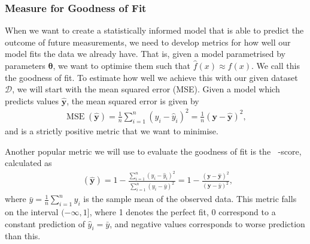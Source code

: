 \documentclass[twocolumn,english,notitlepage]{article}
\renewcommand{\vec}[1]{\boldsymbol{#1}}
\DeclareMathOperator{\mse}{MSE}
\DeclareMathOperator{\Rsquared}{R^2}
\begin{document}
    \subsubsection{Measure for Goodness of Fit}
        When we want to create a statistically informed model that is able to predict the outcome of future measurements, we need to develop metrics for how well our model fits the data we already have. That is, given a model parametrised by parameters $\vec{\theta}$, we want to optimise them such that $\hat{f}(x) \approx f(x)$. We call this the goodness of fit. To estimate how well we achieve this with our given dataset $\mathcal{D}$, we will start with the mean squared error (MSE). Given a model which predicts values $\vec{\hat{y}}$, the mean squared error is given by
        \begin{align}
            \mse(\vec{\hat{y}}) = \frac{1}{n} \sum_{i=1}^n (y_i-\hat{y}_i)^2 = \frac{1}{n} (\vec{y} - \vec{\hat{y}})^2,
            \label{theo:eq:mse}
        \end{align}
        and is a strictly positive metric that we want to minimise.

        Another popular metric we will use to evaluate the goodness of fit is the $\Rsquared$-score, calculated as
        \begin{align}
            \Rsquared(\vec{\hat{y}}) = 1 - \frac{\sum_{i=1}^n (y_i-\hat{y}_i)^2}{\sum_{i=1}^n (y_i-\bar{y})^2} = 1 - \frac{(\vec{y}-\vec{\hat{y}})^2}{(\vec{y}-\bar{y})^2},
            \label{theo:eq:r2}
        \end{align}
        where $\bar{y} = \frac{1}{n}\sum_{i=1}^n y_i$ is the sample mean of the observed data. This metric falls on the interval $(-\infty, 1]$, where 1 denotes the perfect fit, 0 correspond to a constant prediction of $\hat{y}_i = \bar{y}$, and negative values corresponds to worse prediction than this.
\end{document}

